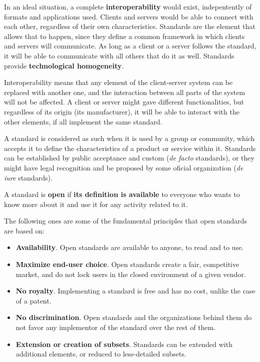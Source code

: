 In an ideal situation, a complete \textbf{interoperability} would exist, indepentently of formats and applications used. Clients and servers would be able to connect with each other, regardless of their own characteristics. Standards are the element that allows that to happen, since they define a common framework in which clients and servers will communicate. As long as a client or a server follows the standard, it will be able to communicate with all others that do it as well. Standards provide \textbf{technological homogeneity}.


Interoperability means that any element of the client-server system can be replaced with another one, and the interaction between all parts of the system will not  be affected. A client or server might gave different functionalities, but regardless of its origin (its manufacturer), it will be able to interact with the other elements, if all implement the same standard.

A standard is considered as such when it is used by a group or community, which accepts it to define the characteristics of a product or service within it. Standards can be established by public acceptance and custom (\emph{de facto} standards), or they might have legal recognition and be proposed by some oficial organization (\emph{de iure} standards).

A standard is \textbf{open} if \textbf{its definition is available} to everyone who wants to know more about it and use it for any activity related to it.

The following ones are some of the fundamental principles that open standards are based on:

\begin{itemize}
	\item \textbf{Availability}. Open standards are available to anyone, to read and to use.
	\item \textbf{Maximize end-user choice}. Open standards create a fair, competitive market, and do not lock users in the closed environment of a given vendor. 
	\item \textbf{No royalty}. Implementing a standard is free and has no cost, unlike the case of a patent.
	\item \textbf{No discrimination}. Open standards and the organizations behind them do not favor any implementor of the standard over the rest of them.
	\item \textbf{Extension or creation of subsets}. Standards can be extended with additional elements, or reduced to less-detailed subsets.
\end{itemize}

